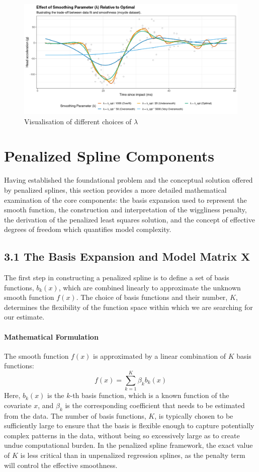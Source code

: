 \documentclass[11pt, a4paper]{article}
\begin{document}
\begin{itemize}
\begin{figure}
 \centering
 \includegraphics[width=\linewidth]{optimal_over_under.png}
 \caption{Visualisation of different choices of $\lambda$}
 \label{fig:enter-label}
\end{figure}

\newpage
\section{ Penalized Spline Components}
Having established the foundational problem and the conceptual solution offered by penalized splines, this section provides a more detailed mathematical examination of the core components: the basis expansion used to represent the smooth function, the construction and interpretation of the wiggliness penalty, the derivation of the penalized least squares solution, and the concept of effective degrees of freedom which quantifies model complexity.

\subsection{3.1 The Basis Expansion and Model Matrix $\mathbf{X}$}
The first step in constructing a penalized spline is to define a set of basis functions, $b_k(x)$, which are combined linearly to approximate the unknown smooth function $f(x)$. The choice of basis functions and their number, $K$, determines the flexibility of the function space within which we are searching for our estimate.

\paragraph{Mathematical Formulation}
The smooth function $f(x)$ is approximated by a linear combination of $K$ basis functions:
\[ f(x) = \sum_{k=1}^{K} \beta_k b_k(x) \]
Here, $b_k(x)$ is the $k$-th basis function, which is a known function of the covariate $x$, and $\beta_k$ is the corresponding coefficient that needs to be estimated from the data. The number of basis functions, $K$, is typically chosen to be sufficiently large to ensure that the basis is flexible enough to capture potentially complex patterns in the data, without being so excessively large as to create undue computational burden. In the penalized spline framework, the exact value of $K$ is less critical than in unpenalized regression splines, as the penalty term will control the effective smoothness.


\end{itemize}
\end{document}
